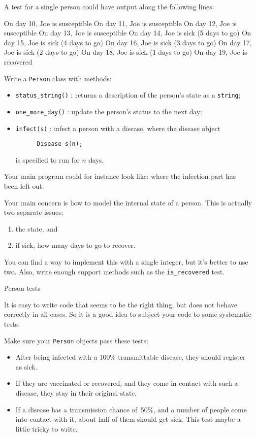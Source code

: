 A test for a single person could have output along the following lines:
\begin{inplaceverbatim}
On day 10, Joe is susceptible
On day 11, Joe is susceptible
On day 12, Joe is susceptible
On day 13, Joe is susceptible
On day 14, Joe is sick (5 days to go)
On day 15, Joe is sick (4 days to go)
On day 16, Joe is sick (3 days to go)
On day 17, Joe is sick (2 days to go)
On day 18, Joe is sick (1 days to go)
On day 19, Joe is recovered
\end{inplaceverbatim}

\begin{exercise}
  \label{ex:infect:person}
  Write a \lstinline{Person} class with methods:
  \begin{itemize}
  \item \lstinline{status_string()} : returns a description of the
    person's state as a \lstinline{string};
  \item \lstinline{one_more_day()} : update the person's status to the next day;
  \item \lstinline{infect(s)} : infect a person with a disease,
    where the disease object
    \begin{lstlisting}
      Disease s(n);
    \end{lstlisting}
    is specified to run for $n$ days.
  \end{itemize}
\end{exercise}

Your main program could for instance look like:
where the infection part has been left out.

Your main concern is how to model the internal state of a person.
This is actually two separate issues:
\begin{enumerate}
\item the state, and
\item if sick, how many days to go to recover.
\end{enumerate}

You can find a way to implement this with a single integer,
but it's better to use two.
Also, write enough support methods such as the \lstinline{is_recovered} test.

 {Person tests}

It is easy to write code that seems to be the right thing,
but does not behave correctly in all cases.
So it is a good idea to subject your code to some systematic tests.

Make sure your \lstinline{Person} objects pass these tests:
\begin{itemize}
\item After being infected with a 100\% transmittable disease,
  they should register as sick.
\item If they are vaccinated or recovered,
  and they come in contact with such a disease,
  they stay in their original state.
\item If a disease has a transmission chance of~50\%,
  and a number of people come into contact with it,
  about half of them should get sick.
  This test maybe a little tricky to write.
\end{itemize}

